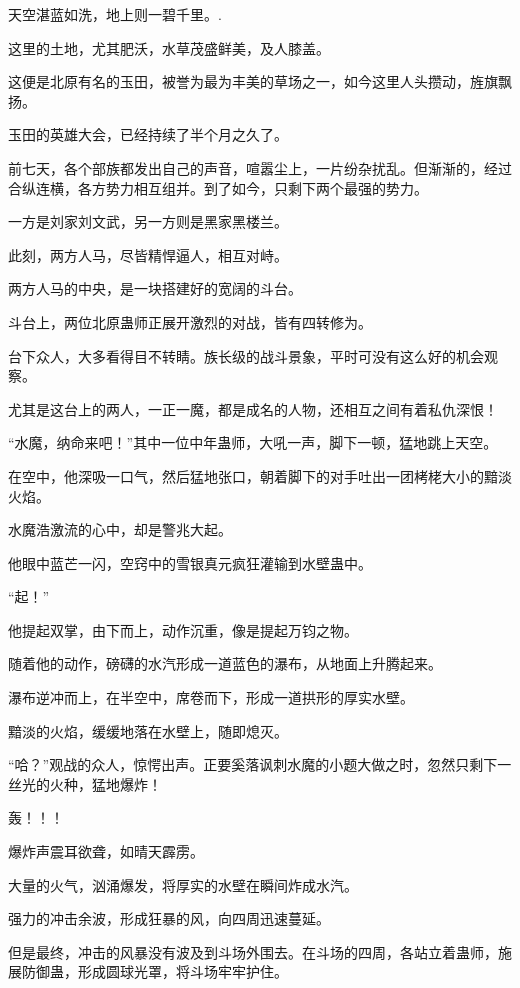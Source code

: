 
\begin{this_body}

天空湛蓝如洗，地上则一碧千里。.

这里的土地，尤其肥沃，水草茂盛鲜美，及人膝盖。

这便是北原有名的玉田，被誉为最为丰美的草场之一，如今这里人头攒动，旌旗飘扬。

玉田的英雄大会，已经持续了半个月之久了。

前七天，各个部族都发出自己的声音，喧嚣尘上，一片纷杂扰乱。但渐渐的，经过合纵连横，各方势力相互组并。到了如今，只剩下两个最强的势力。

一方是刘家刘文武，另一方则是黑家黑楼兰。

此刻，两方人马，尽皆精悍逼人，相互对峙。

两方人马的中央，是一块搭建好的宽阔的斗台。

斗台上，两位北原蛊师正展开激烈的对战，皆有四转修为。

台下众人，大多看得目不转睛。族长级的战斗景象，平时可没有这么好的机会观察。

尤其是这台上的两人，一正一魔，都是成名的人物，还相互之间有着私仇深恨！

“水魔，纳命来吧！”其中一位中年蛊师，大吼一声，脚下一顿，猛地跳上天空。

在空中，他深吸一口气，然后猛地张口，朝着脚下的对手吐出一团栲栳大小的黯淡火焰。

水魔浩激流的心中，却是警兆大起。

他眼中蓝芒一闪，空窍中的雪银真元疯狂灌输到水壁蛊中。

“起！”

他提起双掌，由下而上，动作沉重，像是提起万钧之物。

随着他的动作，磅礴的水汽形成一道蓝色的瀑布，从地面上升腾起来。

瀑布逆冲而上，在半空中，席卷而下，形成一道拱形的厚实水壁。

黯淡的火焰，缓缓地落在水壁上，随即熄灭。

“哈？”观战的众人，惊愕出声。正要奚落讽刺水魔的小题大做之时，忽然只剩下一丝光的火种，猛地爆炸！

轰！！！

爆炸声震耳欲聋，如晴天霹雳。

大量的火气，汹涌爆发，将厚实的水壁在瞬间炸成水汽。

强力的冲击余波，形成狂暴的风，向四周迅速蔓延。

但是最终，冲击的风暴没有波及到斗场外围去。在斗场的四周，各站立着蛊师，施展防御蛊，形成圆球光罩，将斗场牢牢护住。


\end{this_body}
